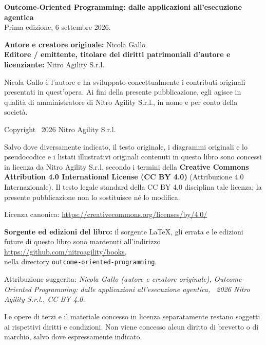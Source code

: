 \documentclass[10pt,oneside,openany]{book}
\newcommand{\mono}[1]{\texttt{#1}}
\begin{document}
{\small{}\setlength{\parskip}{1.5pt}
\textbf{Outcome-Oriented Programming: dalle applicazioni all'esecuzione agentica}\\
Prima edizione, 6 settembre 2026.\par

\textbf{Autore e creatore originale:} Nicola Gallo\\
\textbf{Editore / emittente, titolare dei diritti patrimoniali d'autore e licenziante:} Nitro Agility S.r.l.\par

Nicola Gallo è l'autore e ha sviluppato concettualmente i contributi originali presentati in quest'opera. Ai fini della presente pubblicazione, egli agisce in qualità di amministratore di Nitro Agility S.r.l., in nome e per conto della società.\par

Copyright \textcopyright\ 2026 Nitro Agility S.r.l.\par

Salvo dove diversamente indicato, il testo originale, i diagrammi originali e lo pseudocodice e i listati illustrativi originali contenuti in questo libro sono concessi in licenza da Nitro Agility S.r.l. secondo i termini della \textbf{Creative Commons Attribution 4.0 International License (CC BY 4.0)} (Attribuzione 4.0 Internazionale). Il testo legale standard della CC BY 4.0 disciplina tale licenza; la presente pubblicazione non lo sostituisce né lo modifica.\par

Licenza canonica: \url{https://creativecommons.org/licenses/by/4.0/}\par

\textbf{Sorgente ed edizioni del libro:} il sorgente LaTeX, gli errata e le edizioni future di questo libro sono mantenuti all'indirizzo \url{https://github.com/nitroagility/books},\\
nella directory \mono{outcome-oriented-programming}.\par

Attribuzione suggerita: \emph{Nicola Gallo (autore e creatore originale), Outcome-Oriented Programming: dalle applicazioni all'esecuzione agentica, \textcopyright\ 2026 Nitro Agility S.r.l., CC BY 4.0.}\par

Le opere di terzi e il materiale concesso in licenza separatamente restano soggetti ai rispettivi diritti e condizioni. Non viene concesso alcun diritto di brevetto o di marchio, salvo dove espressamente indicato.\par

}
\end{document}
